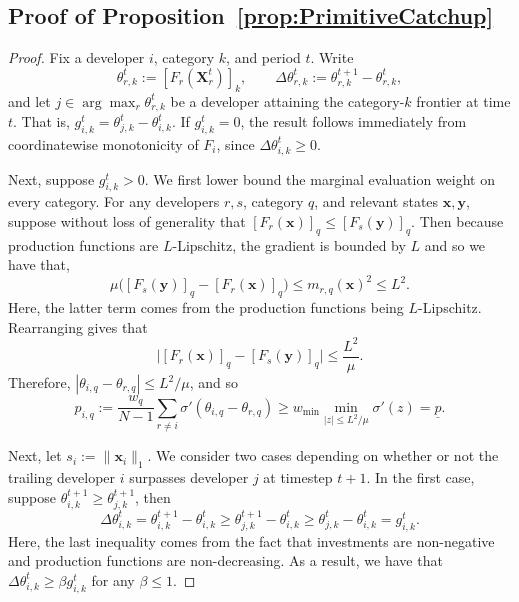 \subsection{Proof of Proposition~\ref{prop:PrimitiveCatchup}}
\label{app:PrimitiveCatchup}
\PrimitiveCatchup*
\begin{proof}
Fix a developer $i$, category $k$, and period $t$.  Write
\[
    \theta_{r,k}^t := [F_r(\mathbf X_r^t)]_k,
    \qquad
    \Delta\theta_{r,k}^t
    :=
    \theta_{r,k}^{t+1}-\theta_{r,k}^t,
\]
and let $j\in\arg\max_r \theta_{r,k}^t$ be a developer attaining
the category-$k$ frontier at time $t$. 
That is, $g_{i,k}^t=\theta_{j,k}^t-\theta_{i,k}^t$.
If $g_{i,k}^t=0$, the result follows immediately from coordinatewise
monotonicity of $F_i$, since $\Delta\theta_{i,k}^t\ge 0$.  

Next, suppose $g_{i,k}^t>0$.
We first lower bound the marginal evaluation weight on every category.
For any developers $r,s$, category $q$, and relevant states
$\mathbf x,\mathbf y$, suppose without loss of generality that $[F_r(\mathbf x)]_q \le [F_s(\mathbf y)]_q$.
Then because production functions are $L$-Lipschitz, the gradient is bounded by $L$ and so we have that,
\[
    \mu\bigl([F_s(\mathbf y)]_q-[F_r(\mathbf x)]_q\bigr)
    \le m_{r,q}(\mathbf x)^2 \leq L^2.
\]
Here, the latter term comes from the production functions being $L$-Lipschitz. 
Rearranging gives that 
\[
    \bigl|[F_r(\mathbf x)]_q-[F_s(\mathbf y)]_q\bigr|
    \le \frac{L^2}{\mu}.
\]
Therefore, $|\theta_{i,q}-\theta_{r,q}| \leq L^2/\mu$, and so 
\[
    p_{i,q}
    :=
    \frac{w_q}{N-1}
    \sum_{r\neq i}
    \sigma'\!\left(\theta_{i,q}-\theta_{r,q}\right)
    \ge
    w_{\min}
    \min_{|z|\le L^2/\mu}\sigma'(z)
    =
    \underline p.
\]

Next, let $s_i:=\|\mathbf x_i\|_1$. 
We consider two cases depending on whether or not the trailing developer $i$ surpasses developer $j$ at timestep $t+1$. 
In the first case, suppose $\theta_{i,k}^{t+1}\ge \theta_{j,k}^{t+1}$, then 
\[
    \Delta\theta_{i,k}^t
    =
    \theta_{i,k}^{t+1}-\theta_{i,k}^t
    \ge
    \theta_{j,k}^{t+1}-\theta_{i,k}^t \geq \theta_{j,k}^{t}-\theta_{i,k}^t
    =
    g_{i,k}^t.
\]
Here, the last inequality comes from the fact that investments are non-negative and production functions are non-decreasing. 
As a result, we have that $ \Delta\theta_{i,k}^t\ge \beta g_{i,k}^t$ for any $\beta \leq 1$. 


\end{proof}
